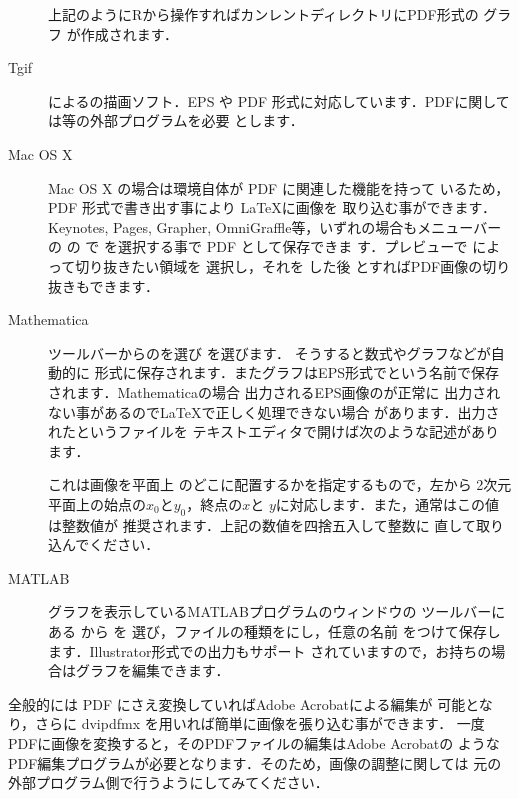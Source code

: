 \begin{description}
  上記のように{R}から操作すればカンレントディレクトリにPDF形式の
  グラフ が作成されます．
\item[Tgif] によるの描画ソフト．EPS
  や PDF 形式に対応しています．PDFに関しては\GS 等の外部プログラムを必要
  とします．
 \item[Mac OS X] Mac OS X の場合は環境自体が PDF に関連した機能を持って
 いるため，PDF 形式で書き出す事により \LaTeX に画像を
 取り込む事ができます．{Keynotes}, {Pages}, {Grapher},
 {OmniGraffle}等，いずれの場合もメニューバーの  の
  で  を選択する事で PDF として保存できま
 す．{プレビュー}で  によって切り抜きたい領域を
 選択し，それを  した後  とすればPDF画像の切り抜きもできます．

%
\item[{Mathematica}]
  ツールバーからのを選び
  を選びます． そうすると数式やグラフなどが自動的に
  {\LaTeXe}形式に保存されます．またグラフはEPS形式で{}という名前で保存されます．{Mathematica}の場合
  出力されるEPS画像のが正常に
  出力されない事があるので{\LaTeX}で正しく処理できない場合
  があります．出力されたというファイルを
  テキストエディタで開けば次のような記述があります．

\begin{intext}
\end{intext}

  これは画像を平面上
  のどこに配置するかを指定するもので，左から
  2次元平面上の始点の$x_0$と$y_0$，終点の$x$と
  $y$に対応します．また，通常はこの値は整数値が
  推奨されます．上記の数値を四捨五入して整数に
  直して取り込んでください．
\item[{MATLAB}]
  グラフを表示しているMATLABプログラムのウィンドウの
  ツールバーにある  から  を
  選び，ファイルの種類をにし，任意の名前
  をつけて保存します．{Illustrator}形式での出力もサポート
  されていますので，お持ちの場合はグラフを編集できます．
\end{description}

全般的には PDF にさえ変換していれば{Adobe Acrobat}による編集が
可能となり，さらに dvipdfmx を用いれば簡単に画像を張り込む事ができます．
一度PDFに画像を変換すると，そのPDFファイルの編集は{Adobe Acrobat}の
ようなPDF編集プログラムが必要となります．そのため，画像の調整に関しては
元の外部プログラム側で行うようにしてみてください．
%

